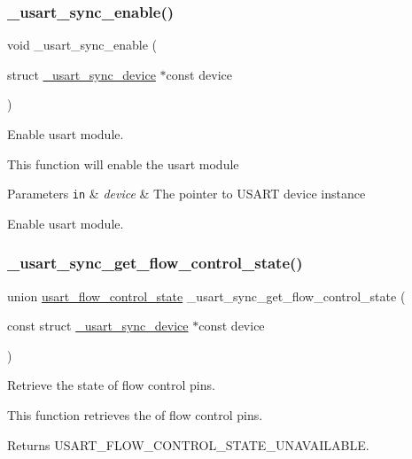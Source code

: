 \subsubsection{\texorpdfstring{\+\_\+usart\+\_\+sync\+\_\+enable()}{\_usart\_sync\_enable()}}
{\footnotesize\ttfamily void \+\_\+usart\+\_\+sync\+\_\+enable (\begin{DoxyParamCaption}\item[{struct \hyperlink{struct__usart__sync__device}{\+\_\+usart\+\_\+sync\+\_\+device} $\ast$const}]{device }\end{DoxyParamCaption})}



Enable usart module. 

This function will enable the usart module


\begin{DoxyParams}[1]{Parameters}
\mbox{\tt in}  & {\em device} & The pointer to U\+S\+A\+RT device instance\\
\hline
\end{DoxyParams}
Enable usart module. \mbox{\label{group___h_p_l_ga5b6662f283d7a2791c7eed77635e9238}} 
\subsubsection{\texorpdfstring{\+\_\+usart\+\_\+sync\+\_\+get\+\_\+flow\+\_\+control\+\_\+state()}{\_usart\_sync\_get\_flow\_control\_state()}}
{\footnotesize\ttfamily union \hyperlink{unionusart__flow__control__state}{usart\+\_\+flow\+\_\+control\+\_\+state} \+\_\+usart\+\_\+sync\+\_\+get\+\_\+flow\+\_\+control\+\_\+state (\begin{DoxyParamCaption}\item[{const struct \hyperlink{struct__usart__sync__device}{\+\_\+usart\+\_\+sync\+\_\+device} $\ast$const}]{device }\end{DoxyParamCaption})}



Retrieve the state of flow control pins. 

This function retrieves the of flow control pins.

\begin{DoxyReturn}{Returns}
U\+S\+A\+R\+T\+\_\+\+F\+L\+O\+W\+\_\+\+C\+O\+N\+T\+R\+O\+L\+\_\+\+S\+T\+A\+T\+E\+\_\+\+U\+N\+A\+V\+A\+I\+L\+A\+B\+LE. 
\end{DoxyReturn}
\mbox{\label{group___h_p_l_ga8fd6539ded0699161df00f23ba6580aa}} 

